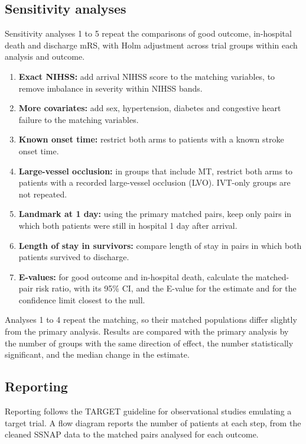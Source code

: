 \subsection{Sensitivity analyses}\label{sec:prot_sensitivity}

Sensitivity analyses 1 to 5 repeat the comparisons of good outcome, in-hospital death and discharge mRS, with Holm adjustment across trial groups within each analysis and outcome.
\begin{enumerate}
\item \textbf{Exact NIHSS:} add arrival NIHSS score to the matching variables, to remove imbalance in severity within NIHSS bands.
\item \textbf{More covariates:} add sex, hypertension, diabetes and congestive heart failure to the matching variables.
\item \textbf{Known onset time:} restrict both arms to patients with a known stroke onset time.
\item \textbf{Large-vessel occlusion:} in groups that include MT, restrict both arms to patients with a recorded large-vessel occlusion (LVO). IVT-only groups are not repeated.
\item \textbf{Landmark at 1 day:} using the primary matched pairs, keep only pairs in which both patients were still in hospital 1 day after arrival.
\item \textbf{Length of stay in survivors:} compare length of stay in pairs in which both patients survived to discharge.
\item[13.] \textbf{E-values:} for good outcome and in-hospital death, calculate the matched-pair risk ratio, with its 95\% CI\cite{agresti_categorical_2013}, and the E-value for the estimate and for the confidence limit closest to the null\cite{vanderweele_sensitivity_2017}.
\end{enumerate}
Analyses 1 to 4 repeat the matching, so their matched populations differ slightly from the primary analysis. Results are compared with the primary analysis by the number of groups with the same direction of effect, the number statistically significant, and the median change in the estimate.

\subsection{Reporting}

Reporting follows the TARGET guideline for observational studies emulating a target trial\cite{cashin_target_2025}. A flow diagram reports the number of patients at each step, from the cleaned SSNAP data to the matched pairs analysed for each outcome.

